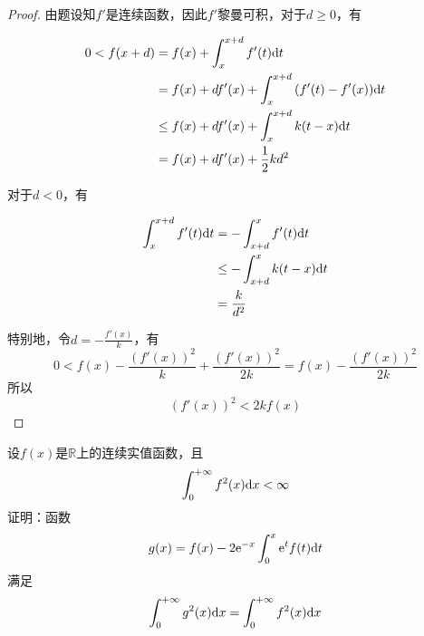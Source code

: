 \begin{proof}

    由题设知$f'$是连续函数，因此$f'$黎曼可积，对于$d \geq 0$，有

    \begin{align*}
        0 < f(x + d) & = f(x) + \int_{x}^{x+d}{f'(t)}\mathrm{d} t \\
        & = f(x) + df'(x) + \int_{x}^{x+d}{(f'(t) - f'(x))}\mathrm{d} t \\
        & \leq f(x) + df'(x) + \int_{x}^{x+d}{k(t - x)}\mathrm{d} t \\
        & = f(x) + df'(x) + \dfrac{1}{2}kd^2
    \end{align*}

    对于$d < 0$，有

    \begin{align*}
        \int_{x}^{x+d}{f'(t)}\mathrm{d} t & = - \int_{x+d}^{x}{f'(t)}\mathrm{d} t\\
        & \leq -  \int_{x+d}^{x}{k(t - x)}\mathrm{d} t \\
        & = \dfrac{k}{d^2}
    \end{align*}

    特别地，令$d = -\frac{f'(x)}{k}$，有
    $$0 < f(x) - \dfrac{\left(f'(x)\right)^2}{k} + \dfrac{\left(f'(x)\right)^2}{2k} = f(x) - \dfrac{\left(f'(x)\right)^2}{2k}$$
    所以
    $$\left( f'(x) \right)^2 < 2kf(x)$$
    
\end{proof}

\begin{proposition}

    设$f(x)$是$\mathbb{R}$上的连续实值函数，且
    $$\int_{0}^{+\infty}{f^2(x)}\mathrm{d} x < \infty$$
    证明：函数
    $$g(x) = f(x) - 2\mathrm{e}^{-x}\int_{0}^{x}{\mathrm{e}^tf(t)}\mathrm{d} t$$
    满足
    $$\int_{0}^{+\infty}{g^2(x)}\mathrm{d} x = \int_{0}^{+\infty}{f^2(x)}\mathrm{d} x$$

\end{proposition}

